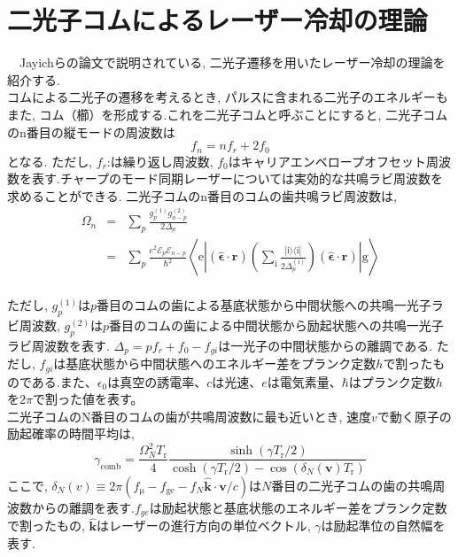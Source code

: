 \documentclass[uplatex, dvipdfmx, a4paper, report, papersize, 11pt]{jsbook}
\begin{document}
\section{二光子コムによるレーザー冷却の理論}
　Jayichらの論文\cite{PhysRevX.6.041004}で説明されている, 二光子遷移を用いたレーザー冷却の理論を紹介する.\\
コムによる二光子の遷移を考えるとき, パルスに含まれる二光子のエネルギーもまた, コム（櫛）を形成する.これを二光子コムと呼ぶことにすると, 二光子コムのn番目の縦モードの周波数は
\begin{equation}
f_n = nf_r + 2f_0
\end{equation}
となる. ただし, $f_r$:は繰り返し周波数, $f_0$はキャリアエンベロープオフセット周波数を表す.チャープのモード同期レーザーについては実効的な共鳴ラビ周波数を求めることができる. 二光子コムのn番目のコムの歯共鳴ラビ周波数は,
\begin{eqnarray}\label{ResonanceRabi}
\Omega _{n} &=&\sum _{p}\frac {g^{\left( 1\right) }_{p}g^{\left( 2\right) }_{n-p}}{2\Delta_p} \nonumber\\
&=& \sum _ { p } \frac { e ^ { 2 } \mathcal { E } _ { p } \mathcal { E } _ { n - p } } { \hbar ^ { 2 } } \left\langle \mathrm { e } \left| ( \hat { \boldsymbol { \epsilon } } \cdot \mathbf { r } ) \left( \sum _ { \mathrm { i } } \frac { | \mathrm { i } \rangle \langle \mathrm { i } | } { 2 \Delta _ { p } ^ { ( \mathrm { i } ) } } \right) ( \hat { \boldsymbol { \epsilon } } \cdot \mathbf { r } ) \right| \mathrm { g } \right\rangle
\end{eqnarray}\\
ただし, $g^{\left( 1\right) }_{p}$は$p$番目のコムの歯による基底状態から中間状態への共鳴一光子ラビ周波数, $g^{\left( 2\right) }_{p}$は$p$番目のコムの歯による中間状態から励起状態への共鳴一光子ラビ周波数を表す.
$\Delta _{p}=pf_{r}+f_{0}-f_{gi}$は一光子の中間状態からの離調である. ただし, $f_{gi}$は基底状態から中間状態へのエネルギー差をプランク定数$h$で割ったものである.また、$\epsilon_0$は真空の誘電率、$c$は光速、$e$は電気素量、$\hbar$はプランク定数$h$を$2\pi$で割った値を表す。\\
二光子コムのN番目のコムの歯が共鳴周波数に最も近いとき, 速度$v$で動く原子の励起確率の時間平均は,
\begin{equation}\label{ExcitationRate}
\gamma_\mathrm{comb} = \frac{\Omega^2_{N}T_\mathrm{r}} {4} \frac{\sinh(\gamma T_\mathrm{r}/2)}{\cosh(\gamma T_\mathrm{r}/2) - \cos(\delta_N(\bm{v})T_\mathrm{r})}
\end{equation}
ここで, $\delta _{N}\left( v\right) \equiv 2\pi ( f_\mathrm{\mu }-f_\mathrm{ge}-f_{N}\widehat {\bm{k}}\cdot {\bm{v}}/c )$は$N$番目の二光子コムの歯の共鳴周波数からの離調を表す.$f_{ge}$は励起状態と基底状態のエネルギー差をプランク定数で割ったもの, $\widehat {\bm{k}}$はレーザーの進行方向の単位ベクトル, $\gamma$は励起準位の自然幅を表す.\\
\end{document}
